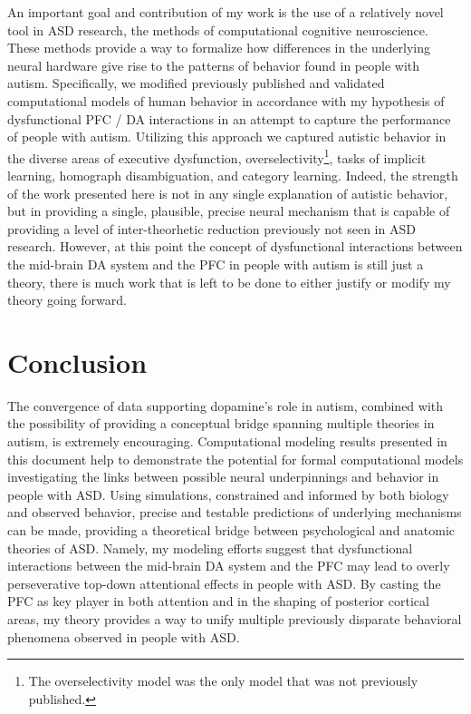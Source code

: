 \documentclass[man]{apa}
\begin{document}
An important goal and contribution of my work is the use of a relatively novel tool in ASD research, the methods of computational cognitive neuroscience.  These methods provide a way to formalize how differences in the underlying neural hardware give rise to the patterns of behavior found in people with autism.  Specifically, we modified previously published and validated computational models of human behavior in accordance with my hypothesis of dysfunctional PFC / DA interactions in an attempt to capture the performance of people with autism.  Utilizing this approach we captured autistic behavior in the diverse areas of executive dysfunction, overselectivity\footnote{The overselectivity model was the only model that was not previously published.}, tasks of implicit learning, homograph disambiguation, and category learning.  Indeed, the strength of the work presented here is not in any single explanation of autistic behavior, but in providing a single, plausible, precise neural mechanism that is capable of providing a level of inter-theorhetic reduction previously not seen in ASD research.  However, at this point the concept of dysfunctional interactions between the mid-brain DA system and the PFC in people with autism is still just a theory, there is much work that is left to be done to either justify or modify my theory going forward. 


\section{Conclusion}
The convergence of data supporting dopamine's role in autism, combined with the possibility of providing a conceptual bridge spanning multiple theories in autism, is extremely encouraging.  Computational modeling results presented in this document help to demonstrate the potential for formal computational models investigating the links between possible neural underpinnings and behavior in people with ASD.  Using simulations, constrained and informed by both biology and observed behavior, precise and testable predictions of underlying mechanisms can be made, providing a theoretical bridge between psychological and anatomic theories of ASD.   Namely, my modeling efforts suggest that dysfunctional interactions between the mid-brain DA system and the PFC may lead to overly perseverative top-down attentional effects in people with ASD.  By casting the PFC as key player in both attention and in the shaping of posterior cortical areas, my theory provides a way to unify multiple previously disparate behavioral phenomena observed in people with ASD.


\end{document}
